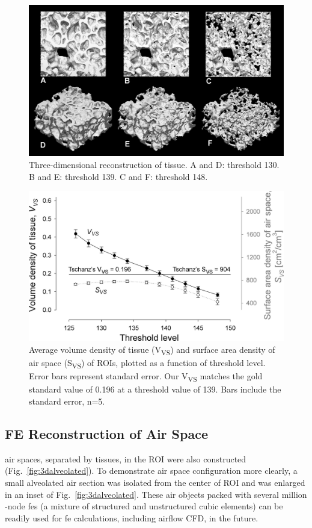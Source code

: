 \begin{figure}[htb]
	\centering
	\includegraphics[width=\imsize]{img/Tsuda2008/Tsuda-07}
	\caption[Three-dimensional reconstruction of tissue]{Three-dimensional reconstruction of tissue. A and D: threshold 130. B and E: threshold 139. C and F: threshold 148.}
	\label{fig:3dreconstruction}
\end{figure}

\begin{figure}[htb]
	\centering
	\includegraphics[width=\imsize]{img/Tsuda2008/Tsuda-08}
	\caption[Average volume density of tissue and surface area density of air space]{Average volume density of tissue (V\textsubscript{VS}) and surface area density of air space (S\textsubscript{VS}) of \ac{ROI}s, plotted as a function of threshold level. Error bars represent standard error. Our V\textsubscript{VS} matches the gold standard value of 0.196 at a threshold value of 139. Bars include the standard error, n=5.}
	\label{fig:VVSplot}
\end{figure}

\subsection{FE \threed Reconstruction of Air Space}
\threed air spaces, separated by tissues, in the \ac{ROI} were also constructed (Fig.~\ref{fig:3dalveolated}). To demonstrate air space configuration more clearly, a small alveolated air section was isolated from the center of \ac{ROI} and was enlarged in an inset of Fig.~\ref{fig:3dalveolated}. These \threed air objects packed with several million -node \ac{fe}s (a mixture of structured and unstructured cubic elements) can be readily used for \ac{fe} calculations, including airflow \ac{CFD}, in the future.

